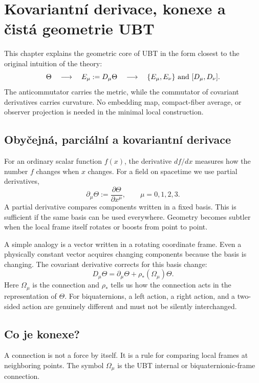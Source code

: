 
\chapter{Kovariantní derivace, konexe a čistá geometrie UBT}
\label{ch:covariant-tetrad}

This chapter explains the geometric core of UBT in the form closest to the
original intuition of the theory:
\[
 \Theta\quad\longrightarrow\quad E_\mu:=D_\mu\Theta
 \quad\longrightarrow\quad
 \{E_\mu,E_\nu\}\ \hbox{and}\ [D_\mu,D_\nu].
\]
The anticommutator carries the metric, while the commutator of covariant
derivatives carries curvature.  No embedding map, compact-fiber average, or
observer projection is needed in the minimal local construction.

\section{Obyčejná, parciální a kovariantní derivace}
For an ordinary scalar function $f(x)$, the derivative $df/dx$ measures how the
number $f$ changes when $x$ changes.  For a field on spacetime we use partial
derivatives,
\[
 \partial_\mu\Theta:=\frac{\partial\Theta}{\partial x^\mu},
 \qquad \mu=0,1,2,3.
\]
A partial derivative compares components written in a fixed basis.  This is
sufficient if the same basis can be used everywhere.  Geometry becomes subtler
when the local frame itself rotates or boosts from point to point.

A simple analogy is a vector written in a rotating coordinate frame.  Even a
physically constant vector acquires changing components because the basis is
changing.  The covariant derivative corrects for this basis change:
\[
 D_\mu\Theta=\partial_\mu\Theta+\rho_*(\Omega_\mu)\Theta.
\]
Here $\Omega_\mu$ is the connection and $\rho_*$ tells us how the connection
acts in the representation of $\Theta$.  For biquaternions, a left action, a
right action, and a two-sided action are genuinely different and must not be
silently interchanged.

\section{Co je konexe?}
A connection is not a force by itself.  It is a rule for comparing local frames
at neighboring points.  The symbol $\Omega_\mu$ is the UBT internal or
biquaternionic-frame connection.

